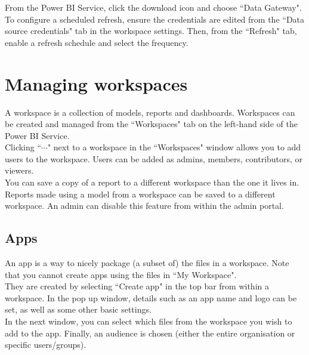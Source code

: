 \documentclass[10pt, openany, twocolumn]{book}
\begin{document}
From the Power BI Service, click the download icon and choose ``Data Gateway". \\

To configure a scheduled refresh, ensure the credentials are edited from the ``Data source credentials" tab in the workspace settings. Then, from the ``Refresh" tab, enable a refresh schedule and select the frequency.\\

\section{Managing workspaces}

A workspace is a collection of models, reports and dashboards. Workspaces can be created and managed from the ``Workspaces" tab on the left-hand side of the Power BI Service.\\

Clicking ``$\cdots$" next to a workspace in the ``Workspaces" window allows you to add users to the workspace. Users can be added as admins, members, contributors, or viewers.\\

You can save a copy of a report to a different workspace than the one it lives in. \\

Reports made using a model from a workspace can be saved to a different workspace. An admin can disable this feature from within the admin portal.\\
\vfill

\subsection*{Apps}

An app is a way to nicely package (a subset of) the files in a workspace. Note that you cannot create apps using the files in ``My Workspace". \\

They are created by selecting ``Create app" in the top bar from within a workspace. In the pop up window, details such as an app name and logo can be set, as well as some other basic settings.\\

In the next window, you can select which files from the workspace you wish to add to the app. Finally, an audience is chosen (either the entire organisation or specific users/groups).\\
\end{document}
